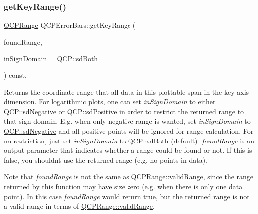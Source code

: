 \mbox{\label{class_q_c_p_error_bars_a6cac828a430d66ac77a167549d01d212}} 
\subsubsection{\texorpdfstring{getKeyRange()}{getKeyRange()}}
{\footnotesize\ttfamily \mbox{\hyperlink{class_q_c_p_range}{Q\+C\+P\+Range}} Q\+C\+P\+Error\+Bars\+::get\+Key\+Range (\begin{DoxyParamCaption}\item[{bool \&}]{found\+Range,  }\item[{\mbox{\hyperlink{namespace_q_c_p_afd50e7cf431af385614987d8553ff8a9}{Q\+C\+P\+::\+Sign\+Domain}}}]{in\+Sign\+Domain = {\ttfamily \mbox{\hyperlink{namespace_q_c_p_afd50e7cf431af385614987d8553ff8a9aa38352ef02d51ddfa4399d9551566e24}{Q\+C\+P\+::sd\+Both}}} }\end{DoxyParamCaption}) const\hspace{0.3cm}{\ttfamily [protected]}, {\ttfamily [virtual]}}

Returns the coordinate range that all data in this plottable span in the key axis dimension. For logarithmic plots, one can set {\itshape in\+Sign\+Domain} to either \mbox{\hyperlink{namespace_q_c_p_afd50e7cf431af385614987d8553ff8a9a2d18af0bc58f6528d1e82ce699fe4829}{Q\+C\+P\+::sd\+Negative}} or \mbox{\hyperlink{namespace_q_c_p_afd50e7cf431af385614987d8553ff8a9a584784b75fb816abcc627cf743bb699f}{Q\+C\+P\+::sd\+Positive}} in order to restrict the returned range to that sign domain. E.\+g. when only negative range is wanted, set {\itshape in\+Sign\+Domain} to \mbox{\hyperlink{namespace_q_c_p_afd50e7cf431af385614987d8553ff8a9a2d18af0bc58f6528d1e82ce699fe4829}{Q\+C\+P\+::sd\+Negative}} and all positive points will be ignored for range calculation. For no restriction, just set {\itshape in\+Sign\+Domain} to \mbox{\hyperlink{namespace_q_c_p_afd50e7cf431af385614987d8553ff8a9aa38352ef02d51ddfa4399d9551566e24}{Q\+C\+P\+::sd\+Both}} (default). {\itshape found\+Range} is an output parameter that indicates whether a range could be found or not. If this is false, you shouldn\textquotesingle{}t use the returned range (e.\+g. no points in data).

Note that {\itshape found\+Range} is not the same as \mbox{\hyperlink{class_q_c_p_range_ab38bd4841c77c7bb86c9eea0f142dcc0}{Q\+C\+P\+Range\+::valid\+Range}}, since the range returned by this function may have size zero (e.\+g. when there is only one data point). In this case {\itshape found\+Range} would return true, but the returned range is not a valid range in terms of \mbox{\hyperlink{class_q_c_p_range_ab38bd4841c77c7bb86c9eea0f142dcc0}{Q\+C\+P\+Range\+::valid\+Range}}.

